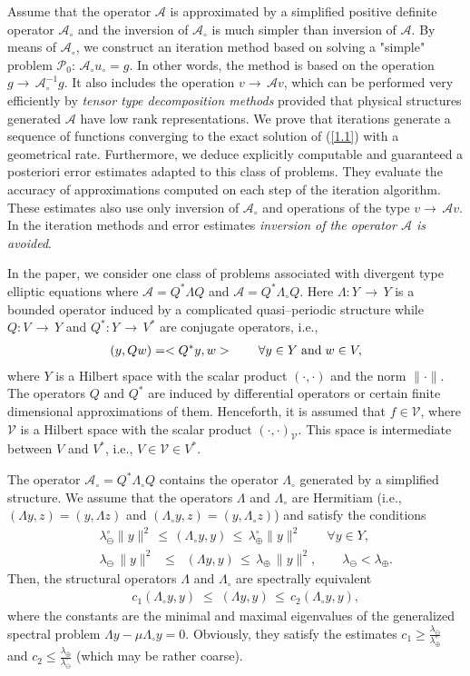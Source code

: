 \documentclass[amstex,amstext,amsfonts,epsf,12pt] {amsart}
\newcommand\ben{\begin{eqnarray}}
\newcommand\een{\end{eqnarray}}
\def\ben{\begin{eqnarray}}
\def\een{\end{eqnarray}}
\def\cV{{\mathcal V}}
\def\lamin{{\lambda}_\ominus}
\def\lamax{{\lambda}_\oplus}
\def\laomin{{\lambda}^\circ_\ominus}
\def\laomax{{\lambda}^\circ_\oplus}
\begin{document}
 Assume that the operator $\mathcal{A}$ is approximated by
a simplified positive definite operator $\mathcal{A}_\circ$ 
and the inversion of $\mathcal{A}_\circ$ is much simpler
than inversion of $\mathcal{A}$. By means of $\mathcal{A}_\circ$,
we construct an iteration method 
 based on solving a "simple" problem ${\mathcal P}_0$:
$\mathcal{A}_\circ u_\circ=g$. In other words, the method is based on the operation 
$g\rightarrow\,\mathcal{A}^{-1}_\circ g$. It also includes the operation
$v\rightarrow \,\mathcal{A}v$, which can be performed very efficiently 
by {\em tensor type decomposition methods} provided
that physical structures generated $\mathcal{A}$ have low rank
representations. We prove that iterations generate a sequence
of functions  converging to the exact solution of (\ref{1.1}) with a geometrical rate. 
Furthermore, we deduce explicitly computable and guaranteed
a posteriori error estimates adapted to this class
of problems. They evaluate the accuracy of approximations
computed on each step of the iteration algorithm.
These estimates also use only inversion of $\mathcal{A}_\circ$
and operations of the type $v\rightarrow \,\mathcal{A}v$. 
In the iteration methods and error estimates
{\em inversion of the operator $\mathcal{A}$ is avoided}.

In the paper,  we consider one  class of problems associated with
divergent type elliptic equations where
$
\mathcal{A}=Q^*\Lambda Q
$ 
and
$
\mathcal{A}=Q^*\Lambda_\circ Q.
$
Here $\Lambda: Y\,\rightarrow \, Y$ is a bounded  operator induced by a complicated quasi--periodic 
structure while $Q:V\,\rightarrow \, Y$ and $Q^*:Y\,\rightarrow \, V^*$ are conjugate
 operators, i.e.,
\ben
\label{1.2}
(y,Qw)=<Q^*y,w>\qquad \forall y\in Y\;{\rm and}\;w\in V,
\een
where $Y$ is a Hilbert space with the scalar product $(\cdot,\cdot)$ and  the norm $\|\cdot\|$. 
The operators $Q$ and $Q^*$ are induced by differential operators
or certain finite dimensional approximations of them. Henceforth, it is assumed that
$f\in \cV$, where
$\cV$ is a Hilbert space with the scalar product $(\cdot,\cdot)_\cV$. 
This space is intermediate between
$V$ and $V^*$, i.e., $V\in \cV\in V^*$.

The operator $\mathcal{A}_\circ=Q^*\Lambda_\circ Q$ contains the operator 
$\Lambda_\circ$ generated by a simplified structure.
We assume that the operators $\Lambda$ and $\Lambda_\circ$ are Hermitiam
(i.e.,
$
(\Lambda y,z)=(y,\Lambda z) 
$
and
$
(\Lambda_\circ y,z)=(y,\Lambda_\circ z)
$)
and satisfy the conditions
\ben 
\label{1.Lambda0}
&&\laomin\|y\|^2\,\leq\, (\Lambda_\circ y, y)\,\leq\,\laomax\|y\|^2\qquad
\forall y\in Y,\\
\label{1.Lambda}
&&\lamin\,\|y\|^2\;\;\leq\;\; (\Lambda y, y)\,\leq\,
\lamax\,\|y\|^2, \qquad \lamin<\lamax.
\een
 Then, the structural operators $\Lambda$ and $\Lambda_\circ$ are spectrally equivalent
\ben
\label{1.equivalence}
&&c_1 (\Lambda_\circ y, y)\;\leq\; (\Lambda y, y)\,\leq\,c_2 (\Lambda_\circ y, y),
\een
where  the constants are the minimal and maximal eigenvalues of the generalized
spectral problem $\Lambda y-\mu \Lambda_\circ y=0$.
Obviously, they satisfy the estimates
$c_1\geq\frac{\lamin}{\laomax}$ and 
$c_2\leq\frac{\lamax}{\laomin}$ (which may be rather coarse).
\end{document}
